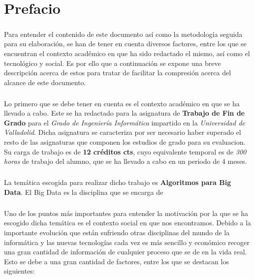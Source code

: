 \documentclass{subfiles}
\begin{document}
  \chapter*{Prefacio}

    \paragraph{}
    Para entender el contenido de este documento así como la metodología seguida para su elaboración, se han de tener en cuenta diversos factores, entre los que se encuentran el contexto académico en que ha sido redactado el mismo, así como el tecnológico y social. Es por ello que a continuación se expone una breve descripción acerca de estos para tratar de facilitar la compresión acerca del alcance de este documento.

    \paragraph{}
    Lo primero que se debe tener en cuenta es el contexto académico en que se ha llevado a cabo. Este se ha redactado para la asignatura de \textbf{Trabajo de Fin de Grado} para el \emph{Grado de Ingeniería Informática} impartido en la \emph{Universidad de Valladolid}. Dicha asignatura se caracteriza por ser necesario haber superado el resto de las asignaturas que componen los estudios de grado para su evaluacion. Su carga de trabajo es de \textbf{12 créditos cts}, cuyo equivalente temporal es de \emph{300 horas} de trabajo del alumno, que se ha llevado a cabo en un periodo de 4 meses.

    \paragraph{}
    La temática escogida para realizar dicho trabajo es \textbf{Algoritmos para Big Data}. El Big Data es la disciplina que se encarga de \cite{wiki:big_data}

    \paragraph{}
    Uno de los puntos más importantes para entender la motivación por la que se ha escogido dicha temática es el contexto social en que nos encontramos. Debido a la importante evolución que están sufriendo otras disciplinas del mundo de la informática y las nuevas tecnologías cada vez es más sencillo y económico recoger una gran cantidad de información de cualquier proceso que se de en la vida real. Esto se debe a una gran cantidad de factores, entre los que se destacan los siguientes:
\end{document}

